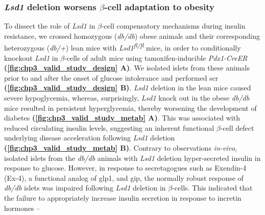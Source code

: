 \subsubsection{\large \textit{Lsd1} deletion worsens $\beta$-cell adaptation to obesity}


To dissect the role of \textit{Lsd1} in $\beta$-cell compensatory mechanisms during insulin resistance, we crossed homozygous (\textit{db/db}) obese animals and their corresponding heterozygous (\textit{db/+}) lean mice with \textit{Lsd1\textsuperscript{fl/fl}} mice, in order to conditionally knockout \textit{Lsd1} in $\beta$-cells of adult mice using tamoxifen-inducible \textit{Pdx1-CreER} \textbf{(\autoref{fig:chp3_valid_study_design} A)}. We isolated islets from these animals prior to and after the onset of glucose intolerance and performed \gls{scr} \textbf{(\autoref{fig:chp3_valid_study_design} B)}. \textit{Lsd1} deletion in the lean mice caused severe hypoglycemia, whereas, surprisingly, \textit{Lsd1} knock out in the obese \textit{db/db} mice resulted in persistent hyperglycemia, thereby worsening the development of diabetes \textbf{(\autoref{fig:chp3_valid_study_metab} A)}. This was associated with reduced circulating insulin levels, suggesting an inherent functional $\beta$-cell defect underlying disease acceleration following \textit{Lsd1} deletion \textbf{(\autoref{fig:chp3_valid_study_metab} B)}. Contrary to observations \textit{in-vivo}, isolated islets from the \textit{db/db} animals with \textit{Lsd1} deletion hyper-secreted insulin in response to glucose. However, in response to secretagogues such as Exendin-4 (Ex-4), a functional analog of \gls{glp1}, and \gls{gip}, the normally robust response of \textit{db/db} islets was impaired following \textit{Lsd1} deletion in $\beta$-cells. This indicated that the failure to appropriately increase insulin secretion in response to incretin hormones --

